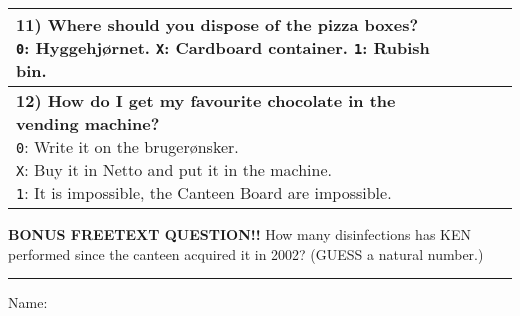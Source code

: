\begin{center}
\begin{tabular}{|p{12cm}|p{0.2cm}|p{0.2cm}|p{0.2cm}|}
{  \textbf{11) Where should you dispose of the pizza boxes?} \\
  \texttt{0}: Hyggehjørnet. \quad
  \texttt{X}: Cardboard container. \quad
  \texttt{1}: Rubish bin.
  \vspace{0.1cm}
} & & & \\\hline
\parbox{12cm}{
  \vspace{0.2cm}
  \textbf{12) How do I get my favourite chocolate in the vending
  machine?} \\
  \texttt{0}: Write it on the brugerønsker. \\
  \texttt{X}: Buy it in Netto and put it in the machine. \\
  \texttt{1}: It is impossible, the Canteen Board are impossible.
  \vspace{0.1cm}
} & & & \\\hline
\end{tabular}

\vspace{0.5cm}

{\large\textbf{BONUS FREETEXT QUESTION!!} How many disinfections has KEN
performed since the canteen acquired it in 2002? (GUESS a natural number.) \\
\vspace{0.5cm} \rule{5cm}{0.4pt}}

\vspace{0.7cm}

{\large Name: \hrulefill}

\end{center}

